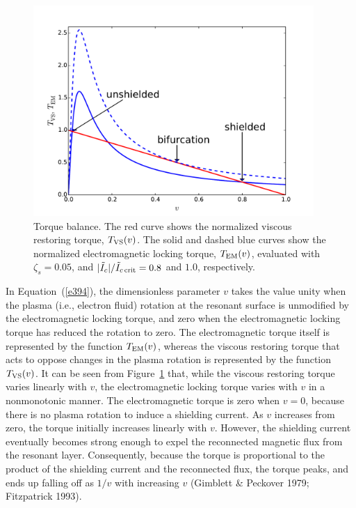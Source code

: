 \documentclass[notitlepage,12pt]{article}
\begin{document}
\begin{figure}[t]
\centerline{\includegraphics[width=0.95\textwidth]{Torque.pdf}}
\caption{Torque balance. The red curve shows the normalized viscous restoring torque, $T_{\rm VS}(v)$. The
solid and dashed blue curves show the normalized electromagnetic locking torque, $T_{\rm EM}(v)$,
evaluated with $\zeta_s=0.05$, and
 $|\tilde{I}_c|/\tilde{I}_{c\,{\rm crit}}=0.8$ and $1.0$, respectively. }\label{f5}
\end{figure}

In Equation~(\ref{e394}), the dimensionless
parameter $v$ takes the value unity when the plasma (i.e., electron fluid) rotation at the resonant surface is unmodified by
the electromagnetic locking torque, and zero when the electromagnetic locking torque has reduced the rotation to zero. The electromagnetic torque itself
is represented  by the function $T_{\rm EM}(v)$, whereas the viscous restoring torque that acts to oppose changes in the plasma rotation is represented
by the function $T_{\rm VS}(v)$. It can be seen from Figure~\ref{f5} that, while the viscous restoring torque varies linearly with $v$,
the electromagnetic locking torque varies with $v$ in a nonmonotonic manner. The electromagnetic torque is
zero when $v=0$, because there is no plasma rotation to induce a shielding current. As $v$ increases from zero, the
torque initially increases linearly with $v$. However, the shielding current eventually becomes strong enough to expel
the reconnected magnetic flux from the resonant layer. Consequently, because the torque
is proportional to the product of the shielding current and the reconnected flux, the torque peaks, and ends up falling off as $1/v$ 
with increasing $v$ (Gimblett \& Peckover 1979; Fitzpatrick 1993). 
\end{document}
